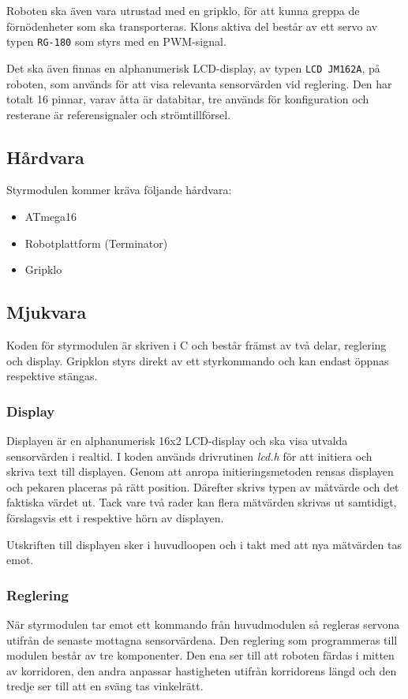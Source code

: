 \documentclass[11pt]{article}
\begin{document}
\begin{flushleft}
Roboten ska även vara utrustad med en gripklo, för att kunna greppa de förnödenheter som ska transporteras. Klons aktiva del består av ett servo av typen \verb+RG-180+ som styrs med en PWM-signal.

Det ska även finnas en alphanumerisk LCD-display, av typen \verb+LCD JM162A+, på roboten, som används för att visa relevanta sensorvärden vid reglering. Den har totalt 16 pinnar, varav åtta är databitar, tre används för konfiguration och resterane är referensignaler och strömtillförsel.

\subsection{Hårdvara}
Styrmodulen kommer kräva följande hårdvara:
\begin{itemize}
	\item ATmega16
	\item Robotplattform (Terminator)
	\item Gripklo %
\end{itemize}

\subsection{Mjukvara}
Koden för styrmodulen är skriven i C och består främst av två delar, reglering och display. Gripklon styrs direkt av ett styrkommando och kan endast öppnas respektive stängas.

\subsubsection{Display}
Displayen är en alphanumerisk 16x2 LCD-display och ska visa utvalda sensorvärden i realtid. I koden används drivrutinen \emph{lcd.h} för att initiera och skriva text till displayen. Genom att anropa initieringsmetoden rensas displayen och pekaren placeras på rätt position. Därefter skrivs typen av mätvärde och det faktiska värdet ut. Tack vare två rader kan flera mätvärden skrivas ut samtidigt, förslagsvis ett i respektive hörn av displayen.

Utskriften till displayen sker i huvudloopen och i takt med att nya mätvärden tas emot.

\subsubsection{Reglering}
När styrmodulen tar emot ett kommando från huvudmodulen så regleras servona utifrån de senaste mottagna sensorvärdena. Den reglering som programmeras till modulen består av tre komponenter. Den ena ser till att roboten färdas i mitten av korridoren, den andra anpassar hastigheten utifrån korridorens längd och den tredje ser till att en sväng tas vinkelrätt.


\end{flushleft}
\end{document}
